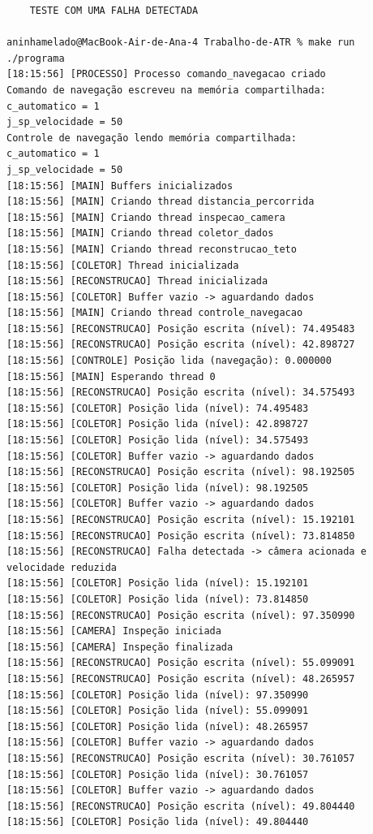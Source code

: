 \documentclass[12pt]{article}
\begin{document}
\begin{verbatim}
    TESTE COM UMA FALHA DETECTADA

aninhamelado@MacBook-Air-de-Ana-4 Trabalho-de-ATR % make run  
./programa
[18:15:56] [PROCESSO] Processo comando_navegacao criado
Comando de navegação escreveu na memória compartilhada:
c_automatico = 1
j_sp_velocidade = 50
Controle de navegação lendo memória compartilhada:
c_automatico = 1
j_sp_velocidade = 50
[18:15:56] [MAIN] Buffers inicializados
[18:15:56] [MAIN] Criando thread distancia_percorrida
[18:15:56] [MAIN] Criando thread inspecao_camera
[18:15:56] [MAIN] Criando thread coletor_dados
[18:15:56] [MAIN] Criando thread reconstrucao_teto
[18:15:56] [COLETOR] Thread inicializada
[18:15:56] [RECONSTRUCAO] Thread inicializada
[18:15:56] [COLETOR] Buffer vazio -> aguardando dados
[18:15:56] [MAIN] Criando thread controle_navegacao
[18:15:56] [RECONSTRUCAO] Posição escrita (nível): 74.495483
[18:15:56] [RECONSTRUCAO] Posição escrita (nível): 42.898727
[18:15:56] [CONTROLE] Posição lida (navegação): 0.000000
[18:15:56] [MAIN] Esperando thread 0
[18:15:56] [RECONSTRUCAO] Posição escrita (nível): 34.575493
[18:15:56] [COLETOR] Posição lida (nível): 74.495483
[18:15:56] [COLETOR] Posição lida (nível): 42.898727
[18:15:56] [COLETOR] Posição lida (nível): 34.575493
[18:15:56] [COLETOR] Buffer vazio -> aguardando dados
[18:15:56] [RECONSTRUCAO] Posição escrita (nível): 98.192505
[18:15:56] [COLETOR] Posição lida (nível): 98.192505
[18:15:56] [COLETOR] Buffer vazio -> aguardando dados
[18:15:56] [RECONSTRUCAO] Posição escrita (nível): 15.192101
[18:15:56] [RECONSTRUCAO] Posição escrita (nível): 73.814850
[18:15:56] [RECONSTRUCAO] Falha detectada -> câmera acionada e velocidade reduzida
[18:15:56] [COLETOR] Posição lida (nível): 15.192101
[18:15:56] [COLETOR] Posição lida (nível): 73.814850
[18:15:56] [RECONSTRUCAO] Posição escrita (nível): 97.350990
[18:15:56] [CAMERA] Inspeção iniciada
[18:15:56] [CAMERA] Inspeção finalizada
[18:15:56] [RECONSTRUCAO] Posição escrita (nível): 55.099091
[18:15:56] [RECONSTRUCAO] Posição escrita (nível): 48.265957
[18:15:56] [COLETOR] Posição lida (nível): 97.350990
[18:15:56] [COLETOR] Posição lida (nível): 55.099091
[18:15:56] [COLETOR] Posição lida (nível): 48.265957
[18:15:56] [COLETOR] Buffer vazio -> aguardando dados
[18:15:56] [RECONSTRUCAO] Posição escrita (nível): 30.761057
[18:15:56] [COLETOR] Posição lida (nível): 30.761057
[18:15:56] [COLETOR] Buffer vazio -> aguardando dados
[18:15:56] [RECONSTRUCAO] Posição escrita (nível): 49.804440
[18:15:56] [COLETOR] Posição lida (nível): 49.804440

\end{verbatim}
\end{document}
